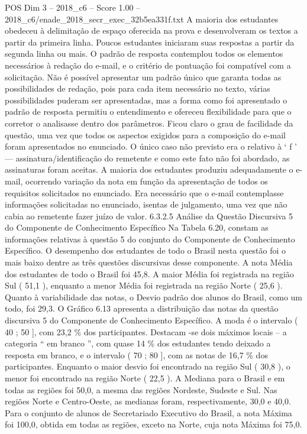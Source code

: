 \begin{textsample}{POS Dim 3 – 2018\_c6 – Score 1.00 – 2018\_c6/enade\_2018\_secr\_exec\_32b5ea331f.txt}
A maioria dos estudantes obedeceu à delimitação de espaço oferecida na prova e desenvolveram os textos a partir da primeira linha.
Poucos estudantes iniciaram suas respostas a partir da segunda linha ou mais.
O padrão de resposta contemplou todos os elementos necessários à redação do e-mail, e o critério de pontuação foi compatível com a solicitação.
Não é possível apresentar um padrão único que garanta todas as possibilidades de redação, pois para cada item necessário no texto, várias possibilidades puderam ser apresentadas, mas a forma como foi apresentado o padrão de resposta permitiu o entendimento e ofereceu flexibilidade para que o corretor o analisasse dentro dos parâmetros.
Ficou claro o grau de facilidade da questão, uma vez que todos os aspectos exigidos para a composição do e-mail foram apresentados no enunciado.
O único caso não previsto era o relativo à ‘ f ’ — assinatura/identificação do remetente e como este fato não foi abordado, as assinaturas foram aceitas.
A maioria dos estudantes produziu adequadamente o e-mail, ocorrendo variação da nota em função da apresentação de todos os requisitos solicitados no enunciado.
Era necessário que o e-mail contemplasse informações solicitadas no enunciado, isentas de julgamento, uma vez que não cabia ao remetente fazer juízo de valor. 6.3.2.5 Análise da Questão Discursiva 5 do Componente de Conhecimento Específico Na Tabela 6.20, constam as informações relativas à questão 5 do conjunto do Componente de Conhecimento Específico.
O desempenho dos estudantes de todo o Brasil nesta questão foi o mais baixo dentre as três questões discursivas desse componente.
A nota Média dos estudantes de todo o Brasil foi 45,8.
A maior Média foi registrada na região Sul ( 51,1 ), enquanto a menor Média foi registrada na região Norte ( 25,6 ).
Quanto à variabilidade das notas, o Desvio padrão dos alunos do Brasil, como um todo, foi 29,3.
O Gráfico 6.13 apresenta a distribuição das notas da questão discursiva 5 do Componente de Conhecimento Específico.
A moda é o intervalo ( 40 ; 50 ], com 23,2 \% dos participantes.
Destacam -se dois máximos locais – a categoria “ em branco ”, com quase 14 \% dos estudantes tendo deixado a resposta em branco, e o intervalo ( 70 ; 80 ], com as notas de 16,7 \% dos participantes.
Enquanto o maior desvio foi encontrado na região Sul ( 30,8 ), o menor foi encontrado na região Norte ( 22,5 ).
A Mediana para o Brasil e em todas as regiões foi 50,0, a mesma das regiões Nordeste, Sudeste e Sul.
Nas regiões Norte e Centro-Oeste, as medianas foram, respectivamente, 30,0 e 40,0.
Para o conjunto de alunos de Secretariado Executivo do Brasil, a nota Máxima foi 100,0, obtida em todas as regiões, exceto na Norte, cuja nota Máxima foi 75,0.

\end{textsample}

